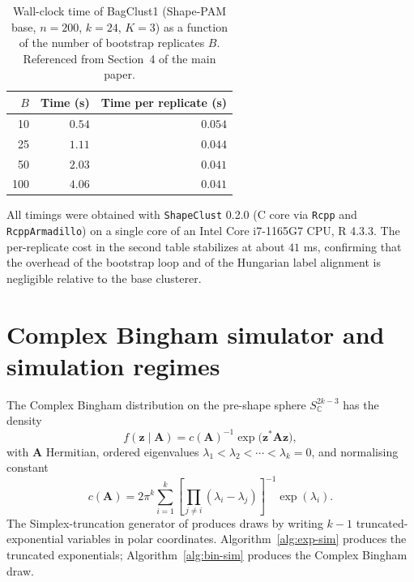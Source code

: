 \documentclass[11pt,a4paper]{article}
\newcommand{\C}{\mathbb{C}}
\newcommand{\Herm}[1]{{#1}^{*}}
\newcommand{\preshape}{S^{2k-3}_{\C}}
\newcommand{\bz}{\mathbf{z}}
\newcommand{\bA}{\mathbf{A}}
\begin{document}
\begin{table}[h]
\centering
\caption{Wall-clock time of BagClust1 (Shape-PAM base, $n=200$, $k=24$,
  $K=3$) as a function of the number of bootstrap replicates $B$.
  Referenced from Section~4 of the main paper.}
\label{tab:scal-B}
\small
\begin{tabular}{rrr}
\toprule
$B$ & Time (s) & Time per replicate (s) \\
\midrule
 10 & $0.54$ & $0.054$ \\
 25 & $1.11$ & $0.044$ \\
 50 & $2.03$ & $0.041$ \\
100 & $4.06$ & $0.041$ \\
\bottomrule
\end{tabular}
\end{table}

All timings were obtained with \texttt{ShapeClust} 0.2.0 (C\raisebox{0.3ex}{\scriptsize++}
core via \texttt{Rcpp} and \texttt{RcppArmadillo}) on a single core of an
Intel Core i7-1165G7 CPU, R 4.3.3. The per-replicate cost in the second
table stabilizes at about $41$ ms, confirming that the overhead of the
bootstrap loop and of the Hungarian label alignment is negligible relative
to the base clusterer.

\clearpage

\section{Complex Bingham simulator and simulation regimes}
\label{sec:bingham-sim}

The Complex Bingham distribution on the pre-shape sphere $\preshape$ has
the density
\begin{equation}
  \label{eq:cbingham-density}
  f(\bz \mid \bA)
  = c(\bA)^{-1}\exp\!\bigl(\Herm{\bz}\bA\bz\bigr),
\end{equation}
with $\bA$ Hermitian, ordered eigenvalues
$\lambda_1<\lambda_2<\cdots<\lambda_k=0$, and normalising constant
\[
  c(\bA)
  = 2\pi^{k}\sum_{i=1}^{k}\left[\prod_{j\ne i}(\lambda_i-\lambda_j)\right]^{-1}
                                       \exp(\lambda_i).
\]
The Simplex-truncation generator of \citet{kent2004simulation} produces
draws by writing $k-1$ truncated-exponential variables in polar
coordinates. Algorithm~\ref{alg:exp-sim} produces the truncated
exponentials; Algorithm~\ref{alg:bin-sim} produces the Complex Bingham
draw.
\end{document}
